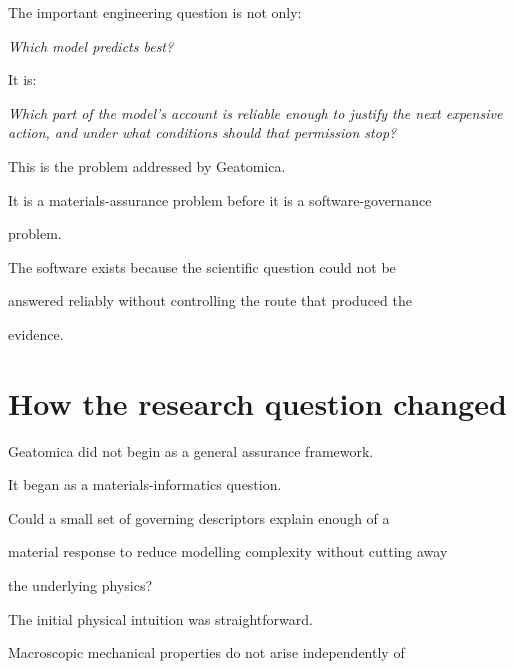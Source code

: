 \documentclass[11pt,a4paper,oneside]{report}
\begin{document}
\begin{engineeringconsequence}



The important engineering question is not only:



\emph{Which model predicts best?}



It is:



\emph{Which part of the model's account is reliable enough to justify the next expensive action, and under what conditions should that permission stop?}



\end{engineeringconsequence}



This is the problem addressed by Geatomica.



It is a materials-assurance problem before it is a software-governance

problem.



The software exists because the scientific question could not be

answered reliably without controlling the route that produced the

evidence.



\section{How the research question changed}



Geatomica did not begin as a general assurance framework.



It began as a materials-informatics question.



Could a small set of governing descriptors explain enough of a

material response to reduce modelling complexity without cutting away

the underlying physics?



The initial physical intuition was straightforward.



Macroscopic mechanical properties do not arise independently of
\end{document}
